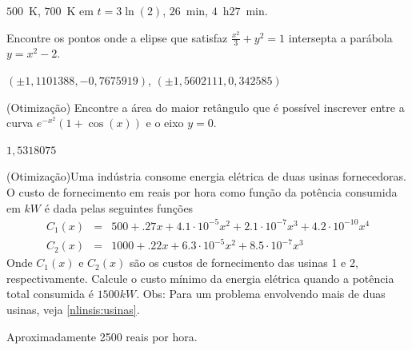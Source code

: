 \begin{resp}
  
$500$~K, $700$~K em $t=3\ln(2)$, $26$~min, $4$~h$27$~min.    
  
\end{resp}

\begin{exer} Encontre os pontos onde a elipse que satisfaz $\frac{x^2}{3}+y^2=1$ intersepta a parábola $y=x^2-2$.
\end{exer}
\begin{resp}
  
$\left(\pm 1,1101388, -0,7675919\right)$, $\left(\pm 1,5602111, 0,342585\right)$
  
\end{resp}

\begin{exer}(Otimização) Encontre a área do maior retângulo que é possível inscrever entre a curva $e^{-x^2}\left(1+\cos(x)\right)$ e o eixo $y=0$.
\end{exer}
\begin{resp}
  
$1,5318075$
  
\end{resp}


\begin{exer}(Otimização)\label{1d:usinas}Uma indústria consome energia elétrica de duas usinas fornecedoras. O custo de fornecimento em reais por hora como função da potência consumida em $kW$ é dada pelas seguintes funções
\begin{eqnarray*}
C_1(x)&=& 500+.27 x + 4.1\cdot 10^{-5}x^2 +2.1\cdot 10^{-7}x^3+4.2\cdot 10^{-10}x^4 \\
C_2(x)&=& 1000+.22 x + 6.3\cdot 10^{-5}x^2 +8.5\cdot 10^{-7}x^3
\end{eqnarray*}
Onde $C_1(x)$ e $C_2(x)$ são os custos de fornecimento das usinas 1 e 2, respectivamente. Calcule o custo mínimo da energia elétrica quando a potência total consumida é  $1500kW$. Obs: Para um problema envolvendo mais de duas usinas, veja \ref{nlinsis:usinas}.
\end{exer}
\begin{resp}
  
 Aproximadamente 2500 reais por hora.    
  
\end{resp}

